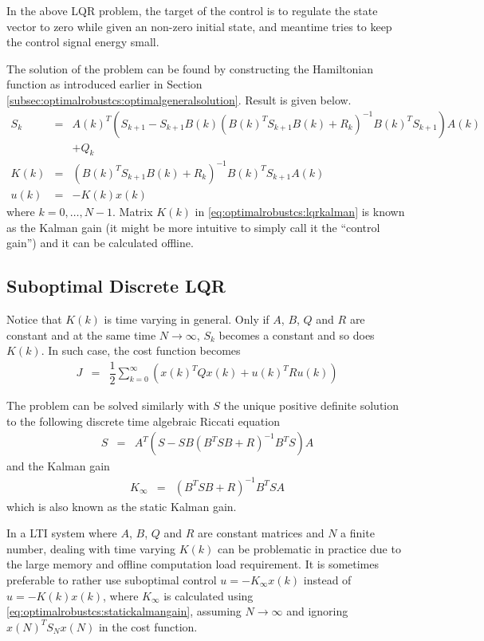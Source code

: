 In the above LQR problem, the target of the control is to regulate the state vector to zero while given an non-zero initial state, and meantime tries to keep the control signal energy small.

The solution of the problem can be found by constructing the Hamiltonian function as introduced earlier in Section \ref{subsec:optimalrobustcs:optimalgeneralsolution}. Result is given below.
\begin{eqnarray}
	S_k &=& A(k)^T\left(S_{k+1}-S_{k+1}B(k)\left(B(k)^TS_{k+1}B(k) + R_k\right)^{-1}B(k)^TS_{k+1}\right)A(k)  \nonumber \\ && + Q_k \label{eq:optimalrobustcs:srecursive} \\
	K(k) &=& \left(B(k)^TS_{k+1}B(k) + R_k\right)^{-1}B(k)^TS_{k+1}A(k) \label{eq:optimalrobustcs:lqrkalman} \\
	u(k) &=& -K(k)x(k) \nonumber
\end{eqnarray}
where $k=0,\ldots, N-1$. Matrix $K(k)$ in \eqref{eq:optimalrobustcs:lqrkalman} is known as the Kalman gain (it might be more intuitive to simply call it the ``control gain'') and it can be calculated offline.

\subsection{Suboptimal Discrete LQR}

Notice that $K(k)$ is time varying in general. Only if $A$, $B$, $Q$ and $R$ are constant and at the same time $N\rightarrow\infty$, $S_k$ becomes a constant and so does $K(k)$. In such case, the cost function becomes
\begin{eqnarray}
	J &=& \dfrac{1}{2}\sum_{k=0}^{\infty}\left(x(k)^TQx(k) + u(k)^TRu(k)\right) \nonumber
\end{eqnarray}

The problem can be solved similarly with $S$ the unique positive definite solution to the following discrete time algebraic Riccati equation
\begin{eqnarray}
	S &=&  A^T\left(S-SB\left(B^TSB + R\right)^{-1}B^TS\right)A \label{eq:optimalrobustcs:sstatics}
\end{eqnarray}
and the Kalman gain
\begin{eqnarray}
	K_\infty &=& \left(B^TSB + R\right)^{-1}B^TSA \label{eq:optimalrobustcs:statickalmangain}
\end{eqnarray}
which is also known as the static Kalman gain.

In a LTI system where $A$, $B$, $Q$ and $R$ are constant matrices and $N$ a finite number, dealing with time varying $K(k)$ can be problematic in practice due to the large memory and offline computation load requirement. It is sometimes preferable to rather use suboptimal control $u=-K_\infty x(k)$ instead of $u=-K(k)x(k)$, where $K_\infty$ is calculated using \eqref{eq:optimalrobustcs:statickalmangain}, assuming $N\rightarrow\infty$ and ignoring $x(N)^TS_Nx(N)$ in the cost function.


